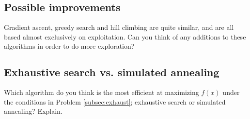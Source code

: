 \documentclass{article}           %
\begin{document}
\subsection{Possible improvements}
Gradient ascent, greedy search and hill climbing are quite similar, and are all based almost exclusively on exploitation.
Can you think of any additions to these algorithms in order to do more exploration?

\subsection{Exhaustive search vs. simulated annealing}
Which algorithm do you think is the most efficient at maximizing \(f(x)\) under the conditions in Problem \ref{subsec:exhaust};
exhaustive search or simulated annealing? Explain.


\end{document}
